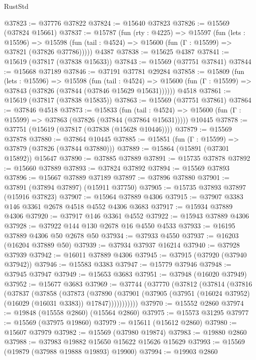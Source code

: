 \begin{lexlean}{RustStd}
\begin{coremodule}
@37823 := @37776 @37822
@37824 := @15640 @37823
@37826 := @15569 (@37824 @15661)
@37837 := @15787
    (fun (rty : @4225) =>
    @15597
      (fun (lets : @15596) =>
      @15598 (fun (tail : @4524) => @15600 (fun (Γ : @15599) => @37821 (@37826 @37786)))))
    @4387
@37838 := @15625 @4387
@37841 := @15619 (@37817 (@37838 @15633))
@37843 := @15569 (@37751 @37841)
@37844 := @15668 @37189
@37846 := @37191 @37781 @29284
@37858 := @15809
    (fun (lets : @15596) =>
    @15598
      (fun (tail : @4524) =>
      @15600 (fun (Γ : @15599) => @37843 (@37826 (@37844 (@37846 @15629 @15631))))))
    @4518
@37861 := @15619 (@37817 (@37838 @15835))
@37863 := @15569 (@37751 @37861)
@37864 := @37846 @4518
@37873 := @15833
    (fun (tail : @4524) => @15600 (fun (Γ : @15599) => @37863 (@37826 (@37844 (@37864 @15631)))))
    @10445
@37878 := @37751 (@15619 (@37817 (@37838 (@15628 @10446))))
@37879 := @15569 @37878
@37880 := @37864 @10445
@37885 := @15851 (fun (Γ : @15599) => @37879 (@37826 (@37844 @37880)))
@37889 := @15864 (@15891 (@37301 @15892)) @15647
@37890 := @37885 @37889
@37891 := @15735 @37878
@37892 := @15660 @37889
@37893 := @37824 @37892
@37894 := @15569 @37893
@37896 := @15667 @37889 @37189
@37897 := @37896 @37880
@37901 := @37891 (@37894 @37897) (@15911 @37750)
@37905 := @15735 @37893 @37897 (@15916 @37823)
@37907 := @15964 @37889 @4306
@37915 := @37907 @3383 @146 @3361 @2678 @4518 @4552 @4306 @3683
@37917 := @15934 @37889 @4306
@37920 := @37917 @146 @3361 @4552
@37922 := @15943 @37889 @4306
@37928 := @37922 @144 @130 @2678 @16 @4550 @4533
@37933 := @16195 @37889 @4306 @50 @2678 @50
@37934 := @37933 @4550
@37937 := @16203 (@16204 @37889 @50)
@37939 := @37934 @37937 @16214
@37940 := @37928 @37939
@37942 := @16011 @37889 @4306
@37945 := @37915 (@37920 (@37940 @37942))
@37946 := @15583 @3383
@37947 := @15779 @37946
@37948 := @37945 @37947
@37949 := @15653 @3683
@37951 := @37948 (@16020 @37949)
@37952 := @15677 @3683
@37969 := @37744
    (@37770
      (@37812
        (@37814
          (@37816
            (@37837
              (@37858
                (@37873
                  (@37890
                    (@37901
                      (@37905 (@37951 (@16024 @37952) (@16029 (@16031 @3383)) @17847)))))))))))
@37970 := @15552 @2860
@37974 := @19848 (@15558 @2860) (@15564 @2860)
@37975 := @15573 @31295
@37977 := @15569 (@37975 @19860)
@37979 := @15611 (@15612 @2860)
@37980 := @15607 @37979
@37982 := @15569 (@37980 @19874)
@37983 := @19880 @2860
@37988 := @37983 @19882 @15650 @15622 @15626 @15629
@37993 := @15569 (@19879 (@37988 @19888 @19893) @19900)
@37994 := @19903 @2860

\end{coremodule}
\end{lexlean}
